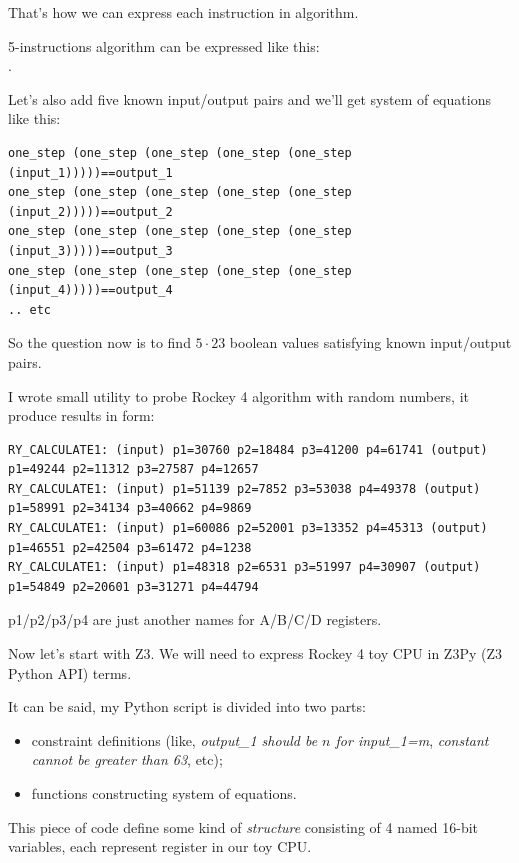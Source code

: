 That's how we can express each instruction in algorithm.

5-instructions algorithm can be expressed like this:\\
.

Let's also add five known input/output pairs and we'll get system of equations like this:

\begin{lstlisting}
one_step (one_step (one_step (one_step (one_step (input_1)))))==output_1
one_step (one_step (one_step (one_step (one_step (input_2)))))==output_2
one_step (one_step (one_step (one_step (one_step (input_3)))))==output_3
one_step (one_step (one_step (one_step (one_step (input_4)))))==output_4
.. etc
\end{lstlisting}

So the question now is to find $5 \cdot 23$ boolean values satisfying known input/output pairs.

I wrote small utility to probe Rockey 4 algorithm with random numbers, it produce results in form:

\begin{lstlisting}
RY_CALCULATE1: (input) p1=30760 p2=18484 p3=41200 p4=61741 (output) p1=49244 p2=11312 p3=27587 p4=12657
RY_CALCULATE1: (input) p1=51139 p2=7852 p3=53038 p4=49378 (output) p1=58991 p2=34134 p3=40662 p4=9869
RY_CALCULATE1: (input) p1=60086 p2=52001 p3=13352 p4=45313 (output) p1=46551 p2=42504 p3=61472 p4=1238
RY_CALCULATE1: (input) p1=48318 p2=6531 p3=51997 p4=30907 (output) p1=54849 p2=20601 p3=31271 p4=44794
\end{lstlisting}

p1/p2/p3/p4 are just another names for A/B/C/D registers.

Now let's start with Z3. We will need to express Rockey 4 toy CPU in Z3Py (Z3 Python \ac{API}) terms.

It can be said, my Python script is divided into two parts: 

\begin{itemize}
\item constraint definitions (like, \emph{output\_1 should be $n$ for input\_1=m},
\emph{constant cannot be greater than 63}, etc); 

\item functions constructing system of equations.
\end{itemize}

This piece of code define some kind of \emph{structure} consisting of 4 named 16-bit variables,
each represent register in our toy CPU.

